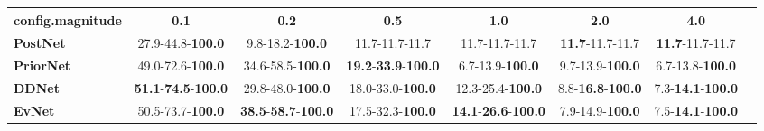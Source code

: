 \begin{tabular}{lccccccc}
\toprule
\textbf{config.magnitude} &                                         0.1 &                                         0.2 &                                         0.5 &                                         1.0 &                               2.0 &                               4.0 \\
\midrule
\textbf{PostNet } &                    27.9-44.8-\textbf{100.0} &                     9.8-18.2-\textbf{100.0} &                              11.7-11.7-11.7 &                              11.7-11.7-11.7 &           \textbf{11.7}-11.7-11.7 &           \textbf{11.7}-11.7-11.7 \\
\textbf{PriorNet} &                    49.0-72.6-\textbf{100.0} &                    34.6-58.5-\textbf{100.0} &  \textbf{19.2}-\textbf{33.9}-\textbf{100.0} &                     6.7-13.9-\textbf{100.0} &           9.7-13.9-\textbf{100.0} &           6.7-13.8-\textbf{100.0} \\
\textbf{DDNet   } &  \textbf{51.1}-\textbf{74.5}-\textbf{100.0} &                    29.8-48.0-\textbf{100.0} &                    18.0-33.0-\textbf{100.0} &                    12.3-25.4-\textbf{100.0} &  8.8-\textbf{16.8}-\textbf{100.0} &  7.3-\textbf{14.1}-\textbf{100.0} \\
\textbf{EvNet   } &                    50.5-73.7-\textbf{100.0} &  \textbf{38.5}-\textbf{58.7}-\textbf{100.0} &                    17.5-32.3-\textbf{100.0} &  \textbf{14.1}-\textbf{26.6}-\textbf{100.0} &           7.9-14.9-\textbf{100.0} &  7.5-\textbf{14.1}-\textbf{100.0} \\
\bottomrule
\end{tabular}
